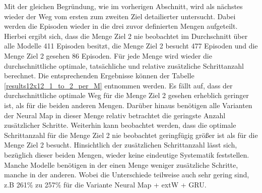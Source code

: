 Mit der gleichen Begründung, wie im vorherigen Abschnitt, wird als nächstes wieder der Weg vom ersten zum zweiten Ziel detailierter untersucht. Dabei werden die Episoden wieder in die drei zuvor definierten Mengen aufgeteilt. Hierbei ergibt sich, dass die Menge \glqq Ziel 2 nie beobachtet\grqq{} im Durchschnitt über alle Modelle 411 Episoden besitzt, die Menge \glqq Ziel 2 besucht\grqq{} 477 Episoden und die Menge \glqq Ziel 2 gesehen\grqq{} 86 Episoden. Für jede Menge wird wieder die durchschnittliche optimale, tatsächliche und relative zusätzliche Schrittanzahl berechnet. Die entsprechenden Ergebnisse können der Tabelle \ref{results12x12_1_to_2_per_M} entnommen werden. Es fällt auf, dass der durchschnittliche optimale Weg für die Menge \glqq Ziel 2 gesehen\grqq{} erheblich geringer ist, als für die beiden anderen Mengen. Darüber hinaus benötigen alle Varianten der Neural Map in dieser Menge relativ betrachtet die geringste Anzahl zusätzlicher Schritte. Weiterhin kann beobachtet werden, dass die optimale Schrittanzahl für die Menge \glqq Ziel 2 nie beobachtet\grqq{} geringfügig größer ist als für die Menge \glqq Ziel 2 besucht\grqq{}. Hinsichtlich der zusätzlichen Schrittanzahl lässt sich, bezüglich dieser beiden Mengen, wieder keine eindeutige Systematik feststellen. Manche Modelle benötigen in der einen Menge weniger zusätzliche Schritte, manche in der anderen. Wobei die Unterschiede teilweise auch sehr gering sind, z.B 261\% zu 257\% für die Variante Neural Map + extW + GRU.

